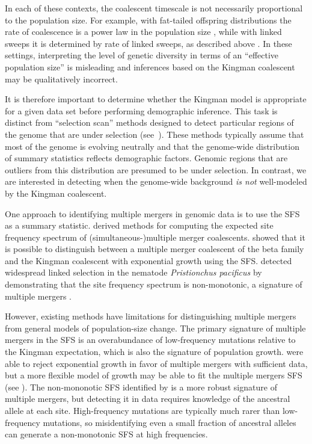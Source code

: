 \documentclass[11pt, letterpaper]{article}   	%
\begin{document}
In each of these contexts, the coalescent timescale is not necessarily proportional to the population size.
For example, with fat-tailed offspring distributions the rate of coalescence is a power law in the population size \autocite{Schweinsberg2003}, while with linked sweeps it is determined by rate of linked sweeps, as described above \autocite{DurrettSchweinsberg2005}.
In these settings, interpreting the level of genetic diversity in terms of an ``effective population size'' is misleading and inferences based on the Kingman coalescent may be qualitatively incorrect.

It is therefore important to determine whether the Kingman model is appropriate for a given data set before performing demographic inference.
This task is distinct from ``selection scan'' methods designed to detect particular regions of the genome that are under selection (see~\cite{VittiEtAl2013}).
These methods typically assume that most of the genome is evolving neutrally and that the genome-wide distribution of summary statistics reflects demographic factors.
Genomic regions that are outliers from this distribution are presumed to be under selection.
In contrast, we are interested in detecting when the genome-wide background \emph{is not} well-modeled by the Kingman coalescent.

One approach to identifying multiple mergers in genomic data is to use the SFS as a summary statistic.
\cite{BirknerEtAl2013, BlathEtAl2016, SpenceEtAl2016} derived methods for computing the expected site frequency spectrum of (simultaneous-)multiple merger coalescents.
\cite{EldonEtAl2015} showed that it is possible to distinguish between a multiple merger coalescent of the beta family and the Kingman coalescent with exponential growth using the SFS.
\cite{RodelspergerEtAl2014} detected widespread linked selection in the nematode \textit{Pristionchus pacificus} by demonstrating that the site frequency spectrum is non-monotonic, a signature of multiple mergers \autocite{NeherHallatscheck2013, BirknerEtAl2013}.

However, existing methods have limitations for distinguishing multiple mergers from general models of population-size change.
The primary signature of multiple mergers in the SFS is an overabundance of low-frequency mutations relative to the Kingman expectation, which is also the signature of population growth.
\cite{EldonEtAl2015} were able to reject exponential growth in favor of multiple mergers with sufficient data, but a more flexible model of growth may be able to fit the multiple mergers SFS (see \cite{MyersEtAl2008, BhaskarSong2014}).
The non-mononotic SFS identified by \cite{RodelspergerEtAl2014} is a more robust signature of multiple mergers, but detecting it in data requires knowledge of the ancestral allele at each site.
High-frequency mutations are typically much rarer than low-frequency mutations, so misidentifying even a small fraction of ancestral alleles can generate a non-monotonic SFS at high frequencies.
\end{document}
